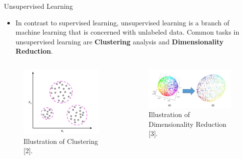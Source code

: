 \documentclass[compress,oilve]{beamer}
\begin{document}
\begin{frame}{Unsupervised Learning}
\begin{itemize}
\item In contrast to supervised learning, unsupervised learning is a branch of machine learning that is concerned with unlabeled data. Common tasks in unsupervised learning are \textbf{Clustering} analysis and \textbf{Dimensionality Reduction}.
\end{itemize}
\begin{columns}
\begin{column}{0.4\textwidth}
\begin{figure}
 \centering
 \includegraphics[scale=0.25]{14}  
 \caption{Illustration of Clustering [2].}
\end{figure}
\end{column}
\begin{column}{0.6\textwidth}
\begin{figure}
 \centering
 \includegraphics[scale=0.25]{16}  
 \caption{Illustration of Dimensionality Reduction [3].}
\end{figure}
\end{column}
\end{columns}
\end{frame}
\end{document}
